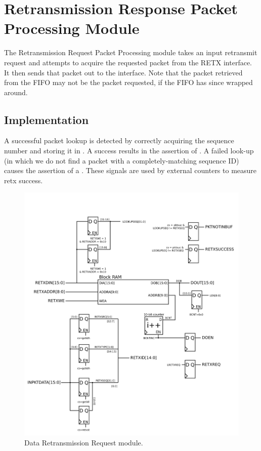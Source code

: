 \section{Retransmission Response Packet Processing Module}

The Retransmission Request Packet Processing module takes an input
retransmit request and attempts to acquire the requested packet from the RETX interface. It then sends
that packet out to the interface. Note that the packet retrieved from
the FIFO may not be the packet requested, if the FIFO has since
wrapped around.

\subsection{Implementation}

A successful packet lookup is detected by correctly acquiring the
sequence number and storing it in . A success
results in the assertion of . A failed look-up (in
which we do not find a packet with a completely-matching sequence ID)
causes the assertion of a . These signals are used
by external counters to measure retx success.


\begin{figure}
\begin{centering}
\includegraphics[scale=0.8]{dataretxresponse.svg}
\end{centering}
\caption{Data Retransmission Request module.}
\label{dataretxresponse}
\end{figure}

